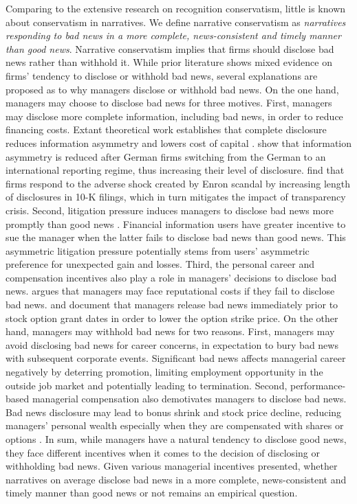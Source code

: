 \documentclass[a4paper]{article}
\begin{document}
\begin{spacing}{2}
Comparing to the extensive research on recognition conservatism, little is known about conservatism in narratives. We define narrative conservatism as \textit{narratives responding to bad news in a more complete, news-consistent and timely manner than good news}. Narrative conservatism implies that firms should disclose bad news rather than withhold it. While prior literature shows mixed evidence on firms' tendency to disclose or withhold bad news, several explanations are proposed as to why managers disclose or withhold bad news. On the one hand, managers may choose to disclose bad news for three motives. First, managers may disclose more complete information, including bad news, in order to reduce financing costs. Extant theoretical work establishes that complete disclosure reduces information asymmetry and lowers cost of capital \citep[e.g.,][]{diamondDisclosureLiquidityCost1991, baimanRelationCapitalMarkets1996}. \citet*{leuzEconomicConsequencesIncreased2000} show that information asymmetry is reduced after German firms switching from the German to an international reporting regime, thus increasing their level of disclosure. \cite{leuzDisclosureCostCapital2009} find that firms respond to the adverse shock created by Enron scandal by increasing length of disclosures in 10-K filings, which in turn mitigates the impact of transparency crisis. Second, litigation pressure induces managers to disclose bad news more promptly than good news \citep*{skinnerWhyFirmsVoluntarily1994, skinnerEarningsDisclosuresStockholder1997, kasznikWarnNotWarn1995}. Financial information users have greater incentive to sue the manager when the latter fails to disclose bad news than good news. This asymmetric litigation pressure potentially stems from users' asymmetric preference for unexpected gain and losses. Third, the personal career and compensation incentives also play a role in managers' decisions to disclose bad news. \citet{skinnerWhyFirmsVoluntarily1994} argues that managers may face reputational costs if they fail to disclose bad news. \citet*{yermackGoodTimingCEO1997} and \citet*{aboodyCEOStockOption2000} document that managers release bad news immediately prior to stock option grant dates in order to lower the option strike price. On the other hand, managers may withhold bad news for two reasons. First, managers may avoid disclosing bad news for career concerns, in expectation to bury bad news with subsequent corporate events. Significant bad news affects managerial career negatively by deterring promotion, limiting employment opportunity in the outside job market and potentially leading to termination. Second, performance-based managerial compensation also demotivates managers to disclose bad news. Bad news disclosure may lead to bonus shrink and stock price decline, reducing managers' personal wealth especially when they are compensated with shares or options \citep{kothariManagersWithholdBad2009}. In sum, while managers have a natural tendency to disclose good news, they face different incentives when it comes to the decision of disclosing or withholding bad news. Given various managerial incentives presented, whether narratives on average disclose bad news in a more complete, news-consistent and timely manner than good news or not remains an empirical question.


\end{spacing}
\end{document}
